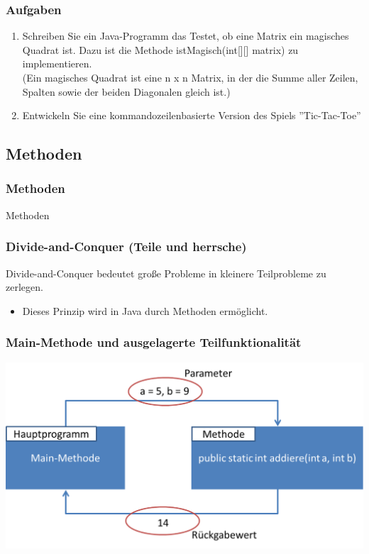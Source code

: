 \begin{frame}
	\frametitle{Aufgaben}
	\begin{enumerate}
	  \item Schreiben Sie ein Java-Programm das Testet, ob eine Matrix ein
	 		magisches Quadrat ist. Dazu ist die Methode istMagisch(int[][] matrix) zu
	  		implementieren.\\(Ein magisches Quadrat ist eine n x n Matrix, in der die
	  		Summe aller Zeilen, Spalten sowie der beiden Diagonalen gleich ist.)
	  \item Entwickeln Sie eine kommandozeilenbasierte Version des Spiels
	  		''Tic-Tac-Toe''
	\end{enumerate}
\end{frame}

\subsection{Methoden}
\begin{frame}[fragile]
	\frametitle{Methoden}
	\huge Methoden
\end{frame}

\begin{frame}[fragile]
	  	\frametitle{Divide-and-Conquer (Teile und herrsche)}
		Divide-and-Conquer bedeutet große Probleme in kleinere Teilprobleme zu
		zerlegen.
		\begin{itemize}
		  \item Dieses Prinzip wird in Java durch Methoden ermöglicht.
		\end{itemize}
\end{frame}

\begin{frame}[fragile]
	  	\frametitle{Main-Methode und ausgelagerte Teilfunktionalität}
		\center
	    \includegraphics[width=1\textwidth,
	    keepaspectratio=true]{bilder/methode.png}
\end{frame}

